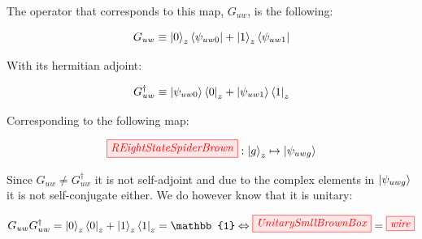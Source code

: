 \documentclass[]{article}
\begin{document}
The operator that corresponds to this map, $G_{uw}$, is the following:

\begin{equation}
	G_{uw} \equiv \ket{0}_z\bra{\psi_{uw0}} + \ket{1}_z\bra{\psi_{uw1}}
\end{equation}

With its hermitian adjoint:

\begin{equation}
G_{uw}^\dagger \equiv \ket{\psi_{uw0}}\bra{0}_z + \ket{\psi_{uw1}}\bra{1}_z
\end{equation}

Corresponding to the following map:

\begin{equation}
\tikzfig{REightStateSpiderBrown} :
\ket{g}_z \mapsto \ket{\psi_{uwg}}
\end{equation}

Since $G_{uw} \neq G_{uw}^\dagger$ it is not self-adjoint and due to the complex elements in $\ket{\psi_{uwg}}$ it is not self-conjugate either. We do however know that it is unitary:

\begin{equation}
	G_{uw}G_{uw}^\dagger = \ket{0}_z\bra{0}_z + \ket{1}_z\bra{1}_z = \mathbb{1} \Leftrightarrow \tikzfig{UnitarySmllBrownBox} = \tikzfig{wire}
\end{equation}
\end{document}
